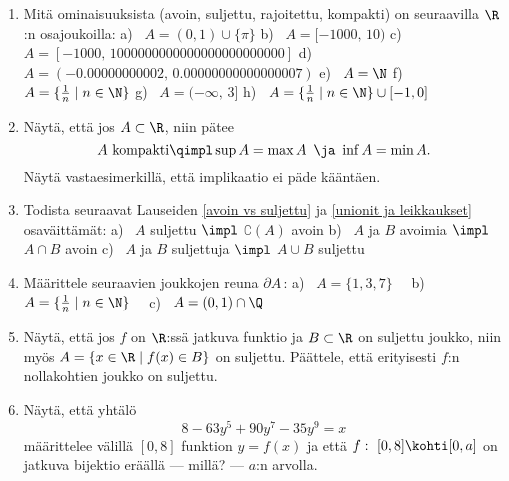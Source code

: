 \Harj
\begin{enumerate}

\item
Mitä ominaisuuksista (avoin, suljettu, rajoitettu, kompakti) on seuraavilla 
$\R$:n osajoukoilla:
\newline
a) \ $A=(0,1) \cup \{\pi\}$ \newline
b) \ $A=[-1000,\,10)$ \newline
c) \ $A=[-1000,\,1000000000000000000000000]$ \newline
d) \ $A=(-0.00000000002,\,0.00000000000000007)$ \newline
e) \ $A=\N$ \newline
f) \ $A=\{\frac{1}{n} \mid n\in\N\}$ \newline
g) \ $A=(-\infty,\,3]$ \newline
h) \ $A=\{\frac{1}{n} \mid n\in\N\}\cup[-1,0]$

\item
Näytä, että jos $A\subset\R$, niin pätee
\[
A\ \text{kompakti} \qimpl \sup A=\max A\,\ \ja\ \inf A=\min A.
\]
Näytä vastaesimerkillä, että implikaatio ei päde kääntäen.

\item
Todista seuraavat Lauseiden \ref{avoin vs suljettu} ja \ref{unionit ja leikkaukset}
osaväittämät: \vspace{1mm}\newline
a) \ $A$ suljettu $\impl$ $\complement(A)$ avoin \newline
b) \ $A$ ja $B$ avoimia $\impl$ $A \cap B$ avoin \newline
c) \ $A$ ja $B$ suljettuja $\impl$ $A \cup B$ suljettu

\item
Määrittele seuraavien joukkojen reuna $\partial A\,$: \vspace{1mm}\newline
a) \ $A=\{1,3,7\} \quad$ 
b) \ $A=\{\frac{1}{n} \mid n\in\N\} \quad$ 
c) \ $A=(0,1)\cap\Q$

\item
Näytä, että jos $f$ on $\R$:ssä jatkuva funktio ja $B\subset\R$ on suljettu joukko, niin
myös $A=\{x\in\R \mid f(x) \in B\}$ on suljettu. Päättele, että erityisesti $f$:n
nollakohtien joukko on suljettu.

\item
Näytä, että yhtälö
\[
8-63y^5+90y^7-35y^9=x
\]
määrittelee välillä $[0,8]$ funktion $y=f(x)$ ja että $f:\ [0,8] \kohti [0,a]$ on jatkuva
bijektio eräällä --- millä? --- $a$:n arvolla.


\end{enumerate}
